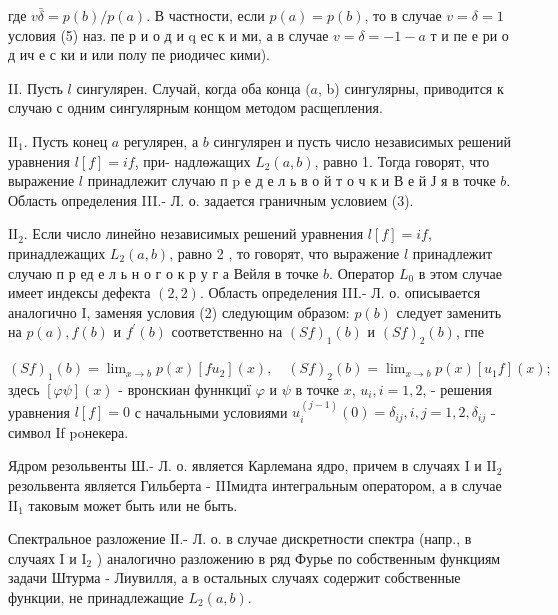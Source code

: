\documentclass[10pt]{article}
\begin{document}
где $v \bar{\delta}=p(b) / p(a)$. В частности, если $p(a)=p(b)$, то в случае $v=\delta=1$ условия (5) наз. пе р и о д и q ес к и ми, а в случае $v=\delta=-1-a$ т и пе е ри о д ич е с ки и или полу пе риодичес кими).



II. Пусть $l$ сингулярен. Случай, когда оба конца $(a$, b) сингулярны, приводится к случаю с одним сингулярным конщом методом расщепления.



$\mathrm{II}_{1}$. Пусть конец $a$ регулярен, а $b$ сингулярен и пусть число независимых решений уравнения $l[f]=i f$, при- надлөжащих $L_{2}(a, b)$, равно 1. Тогда говорят, что выражение $l$ принадлежит случаю п $\mathrm{p}$ е д е л ь в о й т о ч к и В е й Ј я в точке $b$. Область определения III.- Л. о. задается граничным условием (3).



$\mathrm{II}_{2}$. Если число линейно независимых решений уравнения $l[f]=i f$, принадлежащих $L_{2}(a, b)$, равно 2 , то говорят, что выражение $l$ принадлежит случаю п р ед е л ь н о г о к р у г а Вейля в точке $b$. Оператор $L_{0}$ в этом случае имеет индексы дефекта $(2,2)$. Область определения III.- Л. о. описывается аналогично I, заменяя условия (2) следующим образом: $p(b)$ следует заменить на $p(a), f(b)$ и $f^{\prime}(b)$ соответственно на $(S f)_{1}(b)$ и $(S f)_{2}(b)$, гпе



$(S f)_{1}(b)=\lim _{x \rightarrow b} p(x)\left[f u_{2}\right](x), \quad(S f)_{2}(b)=\lim _{x \rightarrow b} p(x)\left[u_{1} f\right](x) ;$ здесь $[\varphi \psi](x)$ - вронскиан фуннкциї $\varphi$ и $\psi$ в точке $x$, $u_{i}, i=1,2$, - решения уравнения $l[f]=0$ с начальными условиями $u_{i}^{(j-1)}(0)=\delta_{i j}, i, j=1,2, \delta_{i j}$ - символ If poнекера.



Ядром резольвенты Ш.- Л. о. является Карлемана ядро, причем в случаях I и $\mathrm{II}_{2}$ резольвента является Гильберта - IIIмидта интегральным оператором, а в случае $\mathrm{II}_{1}$ таковым может быть или не быть.



Спектральное разложение ІІ.- Л. о. в случае дискретности спектра (напр., в случаях I и $\mathrm{I}_{2}$ ) аналогично разложению в ряд Фурье по собственным функциям задачи Штурма - Лиувилля, а в остальных случаях содержит собственные функции, не принадлежащие $L_{2}(a, b)$.
\end{document}
